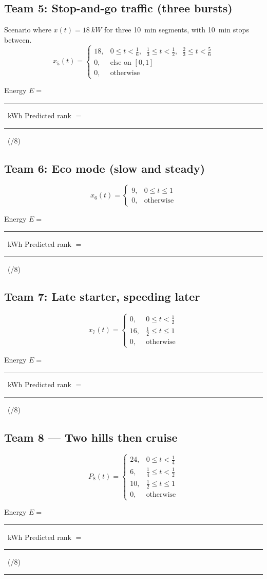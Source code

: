 \documentclass[11pt]{article}
\newcommand{\Eblank}{\rule{3cm}{0.4pt}}
\newcommand{\Rankblank}{\rule{3cm}{0.4pt}}
\begin{document}
\subsection*{Team 5: Stop-and-go traffic (three bursts)}
Scenario where $x(t) = \SI{18}{kW}$ for three \SI{10}{min} segments, with \SI{10}{min} stops between.
\[
x_5(t)=
\begin{cases}
18, & 0 \le t < \tfrac{1}{6}, \;\;\tfrac{1}{3}\le t < \tfrac{1}{2}, \;\;\tfrac{2}{3}\le t < \tfrac{5}{6} \\
0,  & \text{else on }[0,1]\\
0,  & \text{otherwise}
\end{cases}
\]
\begin{tcolorbox}[title=Team 5: Record your results]
Energy \(E=\) \Eblank\ \si{kWh} \quad\quad Predicted rank \(=\) \Rankblank\ (/8)
\end{tcolorbox}

\subsection*{Team 6: Eco mode (slow and steady)}
\[
x_6(t)=
\begin{cases}
9, & 0 \le t \le 1 \\
0, & \text{otherwise}
\end{cases}
\]
\begin{tcolorbox}[title=Team 6: Record your results]
Energy \(E=\) \Eblank\ \si{kWh} \quad\quad Predicted rank \(=\) \Rankblank\ (/8)
\end{tcolorbox}

\subsection*{Team 7: Late starter, speeding later}
\[
x_7(t)=
\begin{cases}
0, & 0 \le t < \tfrac{1}{2} \\
16, & \tfrac{1}{2} \le t \le 1 \\
0, & \text{otherwise}
\end{cases}
\]
\begin{tcolorbox}[title=Team 7: Record your results]
Energy \(E=\) \Eblank\ \si{kWh} \quad\quad Predicted rank \(=\) \Rankblank\ (/8)
\end{tcolorbox}

\subsection*{Team 8 — Two hills then cruise}
\[
P_8(t)=
\begin{cases}
24, & 0 \le t < \tfrac{1}{4} \\
6,  & \tfrac{1}{4} \le t < \tfrac{1}{2} \\
10, & \tfrac{1}{2} \le t \le 1 \\
0,  & \text{otherwise}
\end{cases}
\]
\begin{tcolorbox}[title=Team 8: Record your results]
Energy \(E=\) \Eblank\ \si{kWh} \quad\quad Predicted rank \(=\) \Rankblank\ (/8)
\end{tcolorbox}

\bigskip
\hrule
\bigskip
\end{document}
